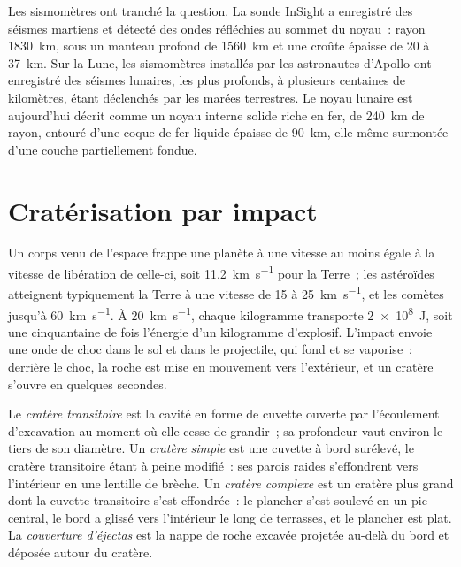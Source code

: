 Les sismomètres ont tranché la question. La sonde InSight a enregistré
des séismes martiens et détecté des ondes réfléchies au sommet du noyau~: rayon
\qty{1830}{km}, sous un manteau profond de \qty{1560}{km} et une croûte épaisse de 20 à
\qty{37}{km}. Sur la Lune, les sismomètres installés par les astronautes d'Apollo
ont enregistré des séismes lunaires, les plus profonds, à plusieurs centaines de
kilomètres, étant déclenchés par les marées terrestres. Le noyau lunaire est
aujourd'hui décrit comme un noyau interne solide riche en fer, de \qty{240}{km} de rayon,
entouré d'une coque de fer liquide épaisse de \qty{90}{km}, elle-même surmontée
d'une couche partiellement fondue.

\section{Cratérisation par impact}\label{sec:b3:planetary-interiors-surfaces:impacts}

Un corps venu de l'espace frappe une planète à une vitesse au moins égale
à la vitesse de libération de celle-ci, soit \qty{11.2}{km.s^{-1}} pour la Terre~; les astéroïdes atteignent typiquement
la Terre à une vitesse de 15 à \qty{25}{km.s^{-1}}, et les comètes jusqu'à
\qty{60}{km.s^{-1}}. À \qty{20}{km.s^{-1}}, chaque kilogramme transporte
\qty{2e8}{J}, soit une cinquantaine de fois l'énergie d'un kilogramme d'explosif. L'impact
envoie une onde de choc dans le sol et dans le projectile, qui fond et se vaporise~;
derrière le choc, la roche est mise en mouvement vers l'extérieur, et un cratère
s'ouvre en quelques secondes.

\begin{definition}\label{def:b3:planetary-interiors-surfaces:crater-morphology}
Le \emph{cratère transitoire} est la cavité en forme de cuvette
ouverte par l'écoulement d'excavation au moment où elle cesse de grandir~; sa profondeur vaut environ
le tiers de son diamètre. Un \emph{cratère
simple} est une cuvette à bord surélevé, le cratère transitoire étant à peine
modifié~: ses parois raides s'effondrent vers l'intérieur en une lentille de brèche. Un
\emph{cratère complexe} est un cratère plus grand dont la cuvette transitoire
s'est effondrée~: le plancher s'est soulevé en un pic central, le bord a glissé vers l'intérieur le long de
terrasses, et le plancher est plat. La \emph{couverture
d'éjectas} est la nappe de roche excavée projetée
au-delà du bord et déposée autour du cratère.
\end{definition}

